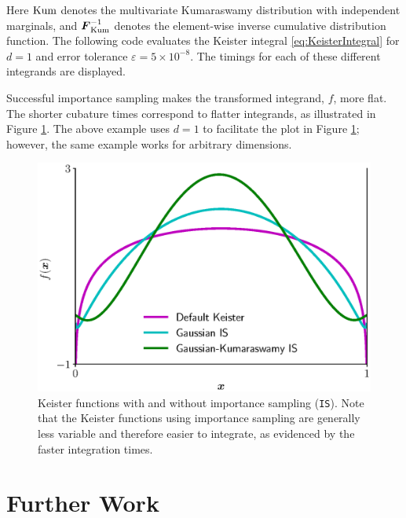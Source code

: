 \documentclass[graybox]{svmult}
\begin{document}
Here $\textup{Kum}$ denotes the multivariate Kumaraswamy distribution with independent marginals, and $ \boldsymbol{F}^{-1}_{\textup{Kum}}$ denotes the element-wise inverse cumulative distribution function.  The following code evaluates the Keister integral \eqref{eq:KeisterIntegral} for $d=1$ and error tolerance $\varepsilon = 5 \times 10^{-8}$.  The timings for each of these different integrands are displayed.



Successful importance sampling makes the transformed integrand, $f$, more flat. The shorter cubature times correspond to flatter integrands, as  illustrated in Figure \ref{fig:mIS}. The above example uses $d=1$ to facilitate the plot in Figure \ref{fig:mIS}; however, the same example works for arbitrary dimensions.
\begin{figure}[t]
    \centering
	\includegraphics[width=.75\textwidth]{QMCSoftwareArticle/vfigs/multiple_IS.eps}
	\caption{Keister functions with and without importance sampling (\texttt{IS}). Note that the Keister functions using importance sampling are generally less variable and therefore easier to integrate, as evidenced by the faster integration times.} \label{fig:mIS}
\end{figure}



\section{Further Work} \label{sec:further}
\end{document}
